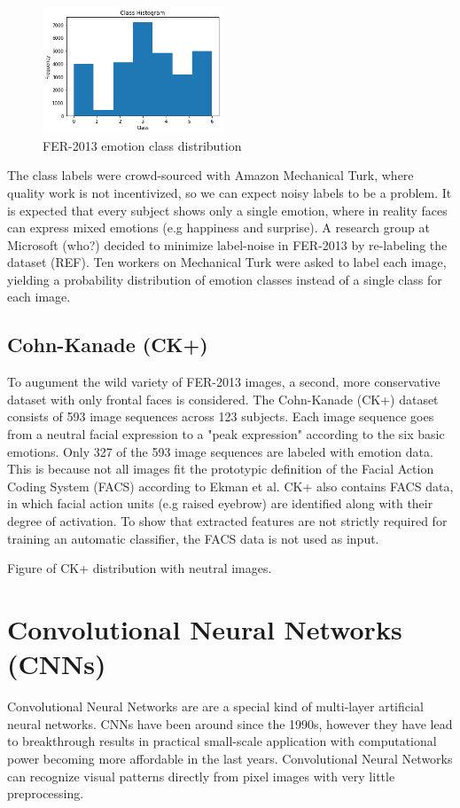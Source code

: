 \documentclass[twoside]{article}
\begin{document}
\begin{multicols}{2}
\begin{figure}[H]
	\includegraphics[width=0.48\textwidth]{class_dist}
	\caption{FER-2013 emotion class distribution}
\end{figure}

The class labels were crowd-sourced with Amazon Mechanical Turk, where quality work is not incentivized, so we can expect noisy labels to be a problem. It is expected that every subject shows only a single emotion, where in reality faces can express mixed emotions (e.g happiness and surprise). A research group at Microsoft (who?) decided to minimize label-noise in FER-2013 by re-labeling the dataset (REF). Ten workers on Mechanical Turk were asked to label each image, yielding a probability distribution of emotion classes instead of a single class for each image.


\subsection{Cohn-Kanade (CK+)}
To augument the wild variety of FER-2013 images, a second, more conservative dataset with only frontal faces is considered. The Cohn-Kanade (CK+) dataset consists of 593 image sequences across 123 subjects. Each image sequence goes from a neutral facial expression to a "peak expression" according to the six basic emotions. Only 327 of the 593 image sequences are labeled with emotion data. This is because not all images fit the prototypic definition of the Facial Action Coding System (FACS) according to Ekman et al. CK+ also contains FACS data, in which facial action units (e.g raised eyebrow) are identified along with their degree of activation. To show that extracted features are not strictly required for training an automatic classifier, the FACS data is not used as input.

Figure of CK+ distribution with neutral images.


\section{Convolutional Neural Networks (CNNs)}
Convolutional Neural Networks are are a special kind of multi-layer artificial neural networks. CNNs have been around since the 1990s, however they have lead to breakthrough results in practical small-scale application with computational power becoming more affordable in the last years. Convolutional Neural Networks can recognize visual patterns directly from pixel images with very little preprocessing. 


\end{multicols}
\end{document}
